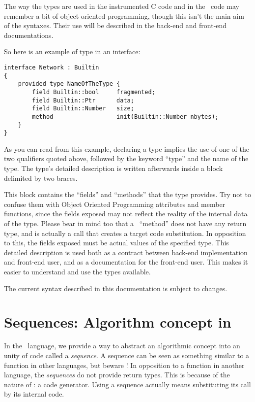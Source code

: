 \documentclass[american]{rtxreport}
\begin{document}
The way the types are used in the instrumented C code and in the \rtx\ code
may remember a bit of object oriented programming, though this isn't the main
aim of the syntaxes. Their use will be described in the back-end and front-end
documentations.

So here is an example of type in an interface:
\begin{lstlisting}
interface Network : Builtin
{
    provided type NameOfTheType {
        field Builtin::bool     fragmented;
        field Builtin::Ptr      data;
        field Builtin::Number   size;
        method                  init(Builtin::Number nbytes);
    }
}
\end{lstlisting}

As you can read from this example, declaring a type implies the use of one of
the two qualifiers quoted above, followed by the keyword ``type'' and the name
of the type. The type's detailed description is written afterwards inside a
block delimited by two braces.

This block contains the ``fields'' and ``methods'' that the type provides.
Try not to confuse them with Object Oriented Programming attributes and member
functions, since the fields exposed may not reflect the reality of the internal
data of the type. Please bear in mind too that a \rtx\ ``method'' does not have
any return type, and is actually a call that creates a target code substitution.
In opposition to this, the fields exposed must be actual values of the
specified type. This detailed description is used both as a contract between
back-end implementation and front-end user, and as a documentation for the
front-end user. This makes it easier to understand and use the types available.

The current syntax described in this documentation is subject to changes.


\section{Sequences: Algorithm concept in \rtx}

In the \rtx\ language, we provide a way to abstract an algorithmic concept into
an unity of code called a \emph{sequence}. A sequence can be seen as something
similar to a function in other languages, but beware ! In opposition to a
function in another language, the \emph{sequences} do not provide return types.
This is because of the nature of \rtx: a code generator. Using a sequence
actually means substituting its call by its internal code.
\end{document}

